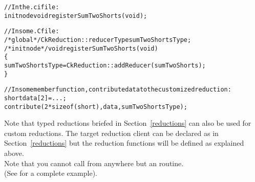 \begin{alltt}
//In the .ci file:
  initnode void registerSumTwoShorts(void);

//In some .C file:
/*global*/ CkReduction::reducerType sumTwoShortsType;
/*initnode*/ void registerSumTwoShorts(void)
\{
  sumTwoShortsType=CkReduction::addReducer(sumTwoShorts);
\}

//In some member function, contribute data to the customized reduction:
  short data[2]=...;
  contribute(2*sizeof(short),data,sumTwoShortsType);
\end{alltt}
Note that typed reductions briefed in Section~\ref{reductions}
can also be used for custom reductions. The target reduction client 
can be declared as in Section~\ref{reductions} but the reduction functions
will be defined as explained above.\\
Note that you cannot call 
from anywhere but an  routine.\\
(See  for a complete example).

